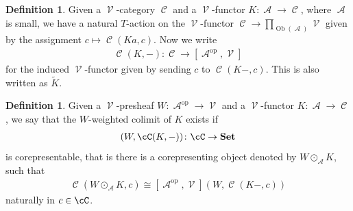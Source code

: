 \documentclass[a4paper,11pt,oneside,openany]{scrbook}
\newcommand{\catname}[1]{{\normalfont\textbf{#1}}}
\newcommand{\Set}{\catname{Set}}
\newcommand{\from}{\colon}
\newcommand{\iso}{\cong}
\DeclareMathOperator{\op}{\text{op}}
\DeclareMathOperator{\V}{\mathcal{V}}
\DeclareMathOperator{\A}{\mathcal{A}}
\DeclareMathOperator{\C}{\mathcal{C}}
\DeclareMathOperator{\Ob}{Ob}
\DeclareMathOperator{\copw}{\odot}
\theoremstyle{definition}
\theoremstyle{definition}
\newtheorem{defn}[thm]{Definition} %
\begin{document}
\begin{defn}
   Given a $\V$-category $\C$ and a $\V$-functor $K \from \A \to \C$, where $\A$ is small, we have a natural $T$-action on the $\V$-functor 
   $\C \to \prod_{\Ob(\A)}\V$ given by the assignment $c \mapsto \C(Ka,c)$. Now we write 
      \begin{align*}
         \C(K,-) \from \C \to [\A^{\op},\V]
      \end{align*}
   for the induced $\V$-functor given by sending $c$ to $\C(K-,c)$. This is also written as $\widetilde{K}$.
\end{defn}

\begin{defn}
   Given a $\V$-presheaf $W\from \A^{\op} \to \V$ and a $\V$-functor $K \from \A \to \C$, we say that the $W$-weighted colimit of $K$ exists if 
      \begin{align*}
         [\A^{\op},\V](W,\cC(K,-))\colon\cC\rightarrow\Set
      \end{align*} 
   is corepresentable, that is there is a corepresenting object denoted by $W \copw_{\A} K$, such that
      \begin{align*}
         \C(W\copw_{\A} K, c) \iso [\A^{\op},\V](W,\C(K-,c))
      \end{align*}
      naturally in $c\in\cC$.
\end{defn}
  
\end{document}

